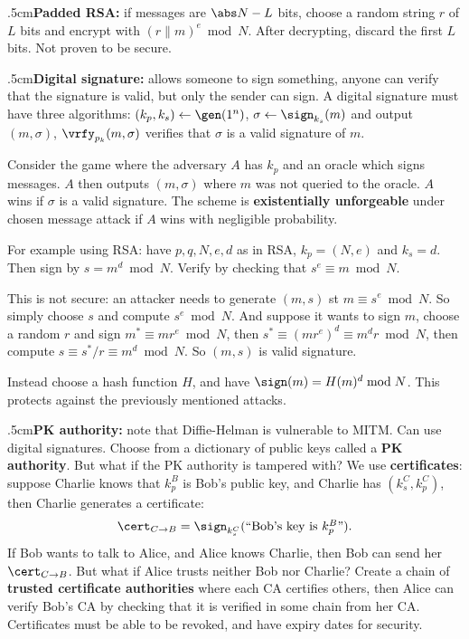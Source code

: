 \quitvmode\kern.5cm{\bf Padded RSA:} if messages are $\abs N-L$ bits, choose a random string $r$ of $L$ bits and encrypt with $(r\|m)^e\bmod N$.
After decrypting, discard the first $L$ bits.
Not proven to be secure.

\quitvmode\kern.5cm{\bf Digital signature:} allows someone to sign something, anyone can verify that the signature is valid, but only the sender can sign.
A digital signature must have three algorithms: $(k_p,k_s)\gets\gen(1^n)$, $\sigma\gets\sign_{k_s}(m)$ and output $(m,\sigma)$, $\vrfy_{p_k}(m,\sigma)$ verifies that $\sigma$ is a valid signature of $m$.

Consider the game where the adversary $A$ has $k_p$ and an oracle which signs messages.
$A$ then outputs $(m,\sigma)$ where $m$ was not queried to the oracle.
$A$ wins if $\sigma$ is a valid signature.
The scheme is {\bf existentially unforgeable} under chosen message attack if $A$ wins with negligible probability.

For example using RSA: have $p,q,N,e,d$ as in RSA, $k_p=(N,e)$ and $k_s=d$.
Then sign by $s=m^d\bmod N$.
Verify by checking that $s^e\equiv m\bmod N$.

This is not secure: an attacker needs to generate $(m,s)$ st $m\equiv s^e\bmod N$.
So simply choose $s$ and compute $s^e\bmod N$.
And suppose it wants to sign $m$, choose a random $r$ and sign $m^*\equiv mr^e\bmod N$, then $s^*\equiv(mr^e)^d\equiv m^dr\bmod N$, then compute $s\equiv s^*/r\equiv m^d\bmod N$.
So $(m,s)$ is valid signature.

Instead choose a hash function $H$, and have $\sign(m)=H(m)^d\bmod N$.
This protects against the previously mentioned attacks.

\quitvmode\kern.5cm{\bf PK authority:} note that Diffie-Helman is vulnerable to MITM.
Can use digital signatures.
Choose from a dictionary of public keys called a {\bf PK authority}.
But what if the PK authority is tampered with?
We use {\bf certificates}: suppose Charlie knows that $k_p^B$ is Bob's public key, and Charlie has $(k_s^C,k_p^C)$, then Charlie generates a certificate:
$$ \cert_{C\to B}=\sign_{k_s^C}(\hbox{``Bob's key is $k_p^B$''}) . $$
If Bob wants to talk to Alice, and Alice knows Charlie, then Bob can send her $\cert_{C\to B}$.
But what if Alice trusts neither Bob nor Charlie?
Create a chain of {\bf trusted certificate authorities} where each CA certifies others, then Alice can verify Bob's CA by checking that it is verified in some chain from her CA.
Certificates must be able to be revoked, and have expiry dates for security.

